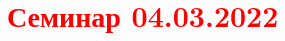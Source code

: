 \documentclass[main.tex]{subfiles}
\begin{document}
\section{\textcolor{red}{Семинар 04.03.2022}}
\end{document}
